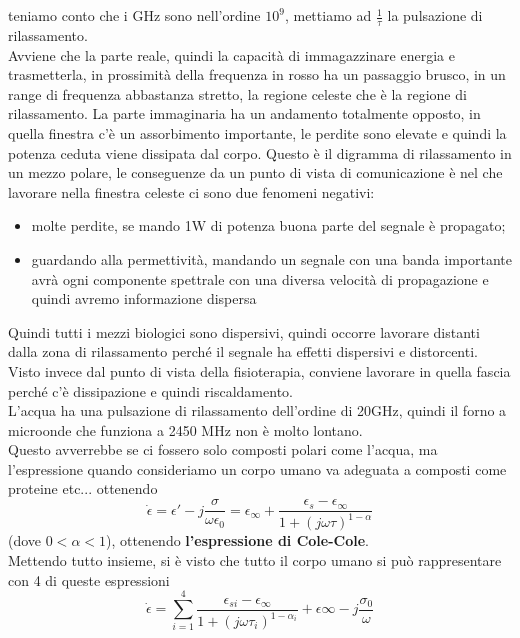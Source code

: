 \documentclass[oneside, 12pt]{extbook}
\begin{document}
\\\\teniamo conto che i GHz sono nell'ordine $10^9$, mettiamo ad $\frac{1}{\tau}$ la pulsazione di rilassamento.\\Avviene che la parte reale, quindi la capacità di immagazzinare energia e trasmetterla, in prossimità della frequenza in rosso ha un passaggio brusco, in un range di frequenza abbastanza stretto, la regione celeste che è la regione di rilassamento. La parte immaginaria ha un andamento totalmente opposto, in quella finestra c'è un assorbimento importante, le perdite sono elevate e quindi la potenza ceduta viene dissipata dal corpo. Questo è il digramma di rilassamento in un mezzo polare, le conseguenze da un punto di vista di comunicazione è nel che lavorare nella finestra celeste ci sono due fenomeni negativi:
\begin{itemize}
	\item molte perdite, se mando 1W di potenza buona parte del segnale è propagato;
	\item guardando alla permettività, mandando un segnale con una banda importante avrà ogni componente spettrale con una diversa velocità di propagazione e quindi avremo informazione dispersa
\end{itemize}
Quindi tutti i mezzi biologici sono dispersivi, quindi occorre lavorare distanti dalla zona di rilassamento perché il segnale ha effetti dispersivi e distorcenti.\\Visto invece dal punto di vista della fisioterapia, conviene lavorare in quella fascia perché c'è dissipazione e quindi riscaldamento.\\L'acqua ha una pulsazione di rilassamento dell'ordine di 20GHz, quindi il forno a microonde che funziona a 2450 MHz non è molto lontano.\\Questo avverrebbe se ci fossero solo composti polari come l'acqua, ma l'espressione quando consideriamo un corpo umano va adeguata a composti come proteine etc... ottenendo
\begin{equation}
	\dot{\epsilon} = \epsilon' - j \frac{\sigma}{\omega\epsilon_0} = \epsilon_{\infty} + \dfrac{\epsilon_s - \epsilon_{\infty}}{1 + (j \omega \tau)^{1 - \alpha}}
\end{equation}
(dove $0 < \alpha < 1$), 
ottenendo \textbf{l'espressione di Cole-Cole}.\\Mettendo tutto insieme, si è visto che tutto il corpo umano si può rappresentare con 4 di queste espressioni
\begin{equation}
	\dot{\epsilon} = \sum\limits_{i = 1}^{4} \dfrac{\epsilon_{si} - \epsilon_{\infty}}{1 + (j \omega \tau_i)^{1 - \alpha_i}} + \epsilon{\infty} - j \frac{\sigma_0}{\omega}
\end{equation}
\end{document}

